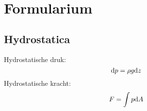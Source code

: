 \chapter{Formularium}
	\section{Hydrostatica}
\begin{multicols}{2}
		Hydrostatische druk:
		\begin{equation}
			\mathrm{d} p = \rho g \mathrm{d} z
		\end{equation}
		Hydrostatische kracht:
		\begin{equation}
			F = \int p \mathrm{d} A
		\end{equation}
\end{multicols}

